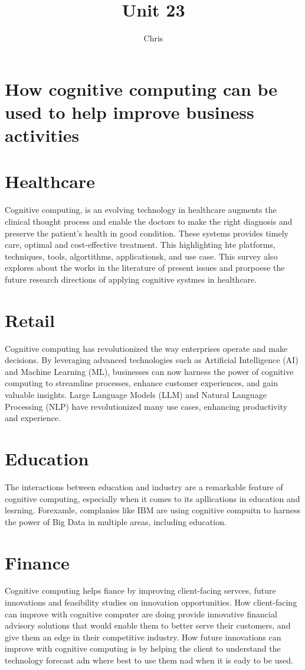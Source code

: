 \documentclass{article}
\title{Unit 23}
\author{Chris}
\date{}
\begin{document}
\section{How cognitive computing can be used to help improve business activities}

\section{Healthcare}
Cognitive computing, is an evolving technology in healthcare augments the clinical thought process and enable the doctors to make the right diagnosis and preserve the patient's health in good condition. These systems provides timely care, optimal and cost-effective treatment. This highlighting hte platforms, techniques, tools, algortithms, applicationsk, and use case. This survey also explores about the works in the literature of present issues and prorpoese the future research directions of applying cognitive systmes in healthcare.


\section{Retail}
Cognitive computing has revolutionized the way enterprises operate and make decisions. By leveraging advanced technologies such as Artificial Intelligence (AI) and Machine Learning (ML), businesses can now harness the power of cognitive computing to streamline processes, enhance customer experiences, and gain valuable insights. Large Language Models (LLM) and Natural Language Processing (NLP) have revolutionized many use cases, enhancing productivity and experience. 

\section{Education}
The interactions between education and industry are a remarkable feature of cognitive computing, especially when it comes to its apllications in education and lesrning. Forexamle, complanies like IBM are using cognitive compuitn to harness the power of Big Data in multiple areas, including education.

\section{Finance}
Cognitive computing helps fiance by improving client-facing servces, future innovations and feasibility studies on innovation opportunities. How client-facing can improve with cognitive computer are doing provide innovative financial advisory solutions that would enable them to better serve their customers, and give them an edge in their competitive industry. How future innovations can improve with cognitive computing is by helping the client to understand the technology forecast adn where best to use them nad when it is eady to be used.
\end{document}
